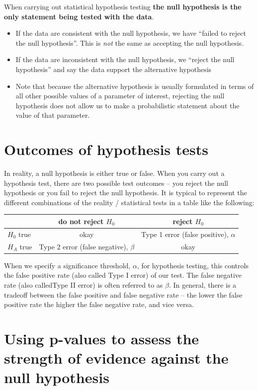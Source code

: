 \documentclass[]{book}
\theoremstyle{definition}
\theoremstyle{definition}
\theoremstyle{definition}
\theoremstyle{remark}
\begin{document}
When carrying out statistical hypothesis testing \textbf{the null
hypothesis is the only statement being tested with the data}.

\begin{itemize}
\item
  If the data are consistent with the null hypothesis, we have ``failed
  to reject the null hypothesis''. This is \emph{not} the same as
  accepting the null hypothesis.
\item
  If the data are inconsistent with the null hypothesis, we ``reject the
  null hypothesis'' and say the data support the alternative hypothesis
\item
  Note that because the alternative hypothesis is usually formulated in
  terms of all other possible values of a parameter of interest,
  rejecting the null hypothesis does not allow us to make a
  probabilistic statement about the value of that parameter.
\end{itemize}

\hypertarget{outcomes-of-hypothesis-tests}{%
\section{Outcomes of hypothesis
tests}\label{outcomes-of-hypothesis-tests}}

In reality, a null hypothesis is either true or false. When you carry
out a hypothesis test, there are two possible test outcomes -- you
reject the null hypothesis or you fail to reject the null hypothesis. It
is typical to represent the different combinations of the reality /
statistical tests in a table like the following:

\begin{longtable}[]{@{}lcc@{}}
\toprule
& do not reject \(H_0\) & reject \(H_0\)\tabularnewline
\midrule
\endhead
\(H_0\) true & okay & Type 1 error (false positive),
\(\alpha\)\tabularnewline
\(H_A\) true & Type 2 error (false negative), \(\beta\) &
okay\tabularnewline
\bottomrule
\end{longtable}

When we specify a significance threshold, \(\alpha\), for hypothesis
testing, this controls the false positive rate (also called Type I
error) of our test. The false negative rate (also calledType II error)
is often referred to as \(\beta\). In general, there is a tradeoff
between the false positive and false negative rate -- the lower the
false positive rate the higher the false negative rate, and vice versa.

\hypertarget{using-p-values-to-assess-the-strength-of-evidence-against-the-null-hypothesis}{%
\section{Using p-values to assess the strength of evidence against the
null
hypothesis}\label{using-p-values-to-assess-the-strength-of-evidence-against-the-null-hypothesis}}
\end{document}
